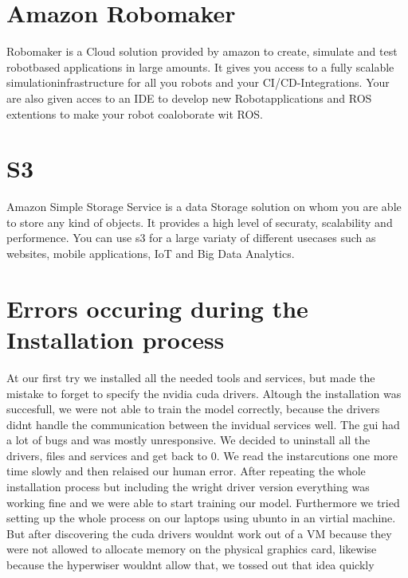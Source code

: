 \section{Amazon Robomaker}
Robomaker is a Cloud solution provided by amazon to create, simulate and test robotbased applications in large amounts. It gives you access to a fully scalable simulationinfrastructure for all you robots and your CI/CD-Integrations. Your are also given acces to an IDE to develop new Robotapplications and ROS extentions to make your robot coaloborate wit ROS.

\section{S3}
Amazon Simple Storage Service is a data Storage solution on whom you are able to store any kind of objects. It provides a high level of securaty, scalability and performence. You can use s3 for a large variaty of different usecases such as websites, mobile applications, IoT and Big Data Analytics.

\section{Errors occuring during the Installation process}
At our first try we installed all the needed tools and services, but made the mistake to forget to specify the nvidia cuda drivers. Altough the installation was succesfull, we were not able to train the model correctly, because the drivers didnt handle the communication between the invidual services well. The gui had a lot of bugs and was mostly unresponsive. We decided to uninstall all the drivers, files and services and get back to 0. We read the instarcutions one more time slowly and then relaised our human error. After repeating the whole installation process but including the wright driver version everything was working fine and we were able to start training our model. Furthermore we tried setting up the whole process on our laptops using ubunto in an virtial machine. But after discovering the cuda drivers wouldnt work out of a VM because they were not allowed to allocate memory on the physical graphics card, likewise because the hyperwiser wouldnt allow that, we tossed out that idea quickly
